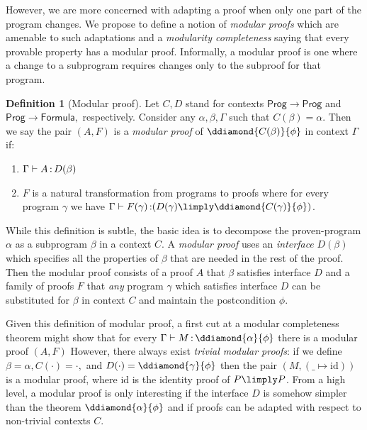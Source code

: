 \documentclass[12pt]{cmuthesis}
\newtheorem{theorem}{Theorem}
\theoremstyle{definition}
\newtheorem{definition}{Definition}
\theoremstyle{remark}
\newcommand{\G}{\Gamma}
\begin{document}
However, we are more concerned with adapting a proof when only one part of the program changes.
We propose to define a notion of \emph{modular proofs} which are amenable to such adaptations and a \emph{modularity completeness} saying that every provable property has a modular proof.
Informally, a modular proof is one where a change to a subprogram requires changes only to the subproof for that program.
\begin{definition}[Modular proof]
Let $C,D$ stand for contexts $\mathsf{Prog} \to \mathsf{Prog}$ and $\mathsf{Prog} \to \mathsf{Formula},$ respectively.
Consider any $\alpha,\beta,\G$ such that $C(\beta) = \alpha$.
Then we say the pair $(A,F)$ is a \emph{modular proof} of $\ddiamond{C(\beta)}{\phi}$ in context $\G$ if:
\begin{enumerate}
\item $\proves{\G}{A}{D(\beta)}$
\item $F$ is a natural transformation from programs to proofs where for every program $\gamma$ we have $\proves{\G}{F(\gamma)}{(D(\gamma) \limply \ddiamond{C(\gamma)}{\phi})}$.
\end{enumerate}
\end{definition}
While this definition is subtle, the basic idea is to decompose the proven-program $\alpha$ as a subprogram $\beta$ in a context $C$.
A \emph{modular proof} uses an \emph{interface} $D(\beta)$ which specifies all the properties of $\beta$ that are needed in the rest of the proof.
Then the modular proof consists of a proof $A$ that $\beta$ satisfies interface $D$ and a family of proofs $F$ that \emph{any} program $\gamma$ which satisfies interface $D$ can be substituted for $\beta$ in context $C$ and maintain the postcondition $\phi$.

Given this definition of modular proof, a first cut at a modular completeness theorem might show that for every $\proves{\G}{M}{\ddiamond{\alpha}{\phi}}$ there is a modular proof $(A,F)$
However, there always exist \emph{trivial modular proofs}: if we define $\beta = \alpha, C(\cdot)=\cdot,$ and $D(\cdot) = \ddiamond{\gamma}{\phi}$ then the pair $(M,(\_ \mapsto \text{id}))$ is a modular proof, where $\text{id}$ is the identity proof of $P \limply P$.
From a high level, a modular proof is only interesting if the interface $D$ is somehow simpler than the theorem $\ddiamond{\alpha}{\phi}$ and if proofs can be adapted with respect to non-trivial contexts $C$.
\end{document}
